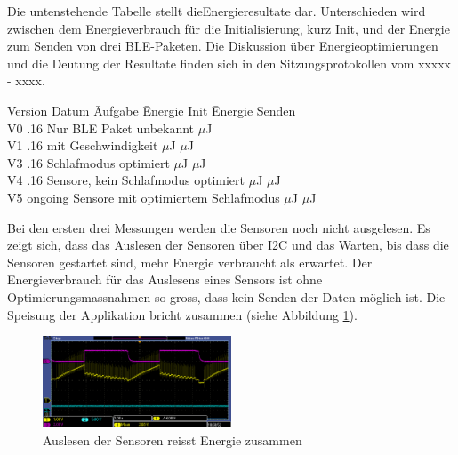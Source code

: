 Die untenstehende Tabelle stellt dieEnergieresultate dar. Unterschieden wird zwischen dem Energieverbrauch für die Initialisierung, kurz Init, und der Energie zum Senden von drei BLE-Paketen. Die Diskussion über Energieoptimierungen und die Deutung der Resultate finden sich in den Sitzungsprotokollen vom xxxxx - xxxx. 


\begin{minipage}{\textwidth}
\begin{tabbing}
    Version   \quad\= Datum    \quad\= Aufgabe\hphantom{re, kein Schlafmodus optimiert} \quad\= Energie Init    \quad\=  Energie Senden \\[0.8ex]
    V0        .16  \> Nur BLE Paket      \> unbekannt             $\mu$J \\
    V1        .16  \> mit Geschwindigkeit       $\mu$J             $\mu$J \\
    V3        .16   \> Schlafmodus optimiert      $\mu$J             $\mu$J \\
    V4        .16     Sensore, kein Schlafmodus optimiert      $\mu$J             $\mu$J \\
    V5        \> ongoing     Sensore mit optimiertem Schlafmodus      $\mu$J             $\mu$J \\
\end{tabbing}
\end{minipage}

Bei den ersten drei Messungen werden die Sensoren noch nicht ausgelesen. Es zeigt sich, dass das Auslesen der Sensoren über I2C und das Warten, bis dass die Sensoren gestartet sind,  mehr Energie verbraucht als erwartet. Der Energieverbrauch für das Auslesens eines Sensors ist ohne Optimierungsmassnahmen so gross, dass kein Senden der Daten möglich ist. Die Speisung der Applikation bricht zusammen (siehe Abbildung \ref{i2c_problem}).

\begin{figure}[ht]
    \includegraphics[width=0.5\textwidth]{3Vorgehen/imag/pic4VSUPbrichtEin.PNG} 
    \caption{Auslesen der Sensoren reisst Energie zusammen}
    \label{i2c_problem}
\end{figure}



